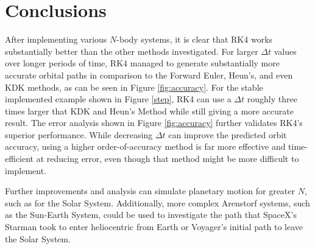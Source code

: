\documentclass[conf]{new-aiaa}
\begin{document}
\section{Conclusions}
After implementing various $N$-body systems, it is clear that RK4 works substantially better than the other methods investigated. For larger $\Delta t$ values over longer periods of time, RK4 managed to generate substantially more accurate orbital paths in comparison to the Forward Euler, Heun's, and even KDK methods, as can be seen in Figure \ref{fig:accuracy}. For the stable implemented example shown in Figure \ref{step}, RK4 can use a $\Delta t$ roughly three times larger that KDK and Heun's Method while still giving a more accurate result. The error analysis shown in Figure \ref{fig:accuracy} further validates RK4's superior performance. While decreasing $\Delta t$ can improve the predicted orbit accuracy, using a higher order-of-accuracy method is far more effective and time-efficient at reducing error, even though that method might be more difficult to implement.

Further improvements and analysis can simulate planetary motion for greater $N$, such as for the Solar System. Additionally, more complex Arenstorf systems, such as the Sun-Earth System, could be used to investigate the path that SpaceX's Starman took to enter heliocentric from Earth or Voyager's initial path to leave the Solar System. 
\pagebreak
\end{document}
